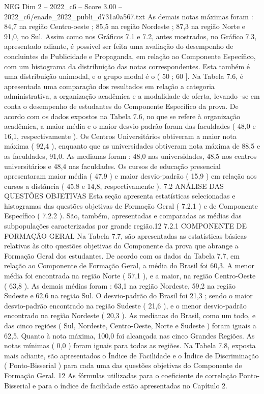 \begin{textsample}{NEG Dim 2 – 2022\_c6 – Score 3.00 – 2022\_c6/enade\_2022\_publi\_d731a0a567.txt}
As demais notas máximas foram : 84,7 na região Centro-oeste ; 85,5 na região Nordeste ; 87,3 na região Norte e 91,0, no Sul.
Assim como nos Gráficos 7.1 e 7.2, antes mostrados, no Gráfico 7.3, apresentado adiante, é possível ser feita uma avaliação do desempenho de concluintes de Publicidade e Propaganda, em relação ao Componente Específico, com um histograma da distribuição das notas correspondentes.
Esta também é uma distribuição unimodal, e o grupo modal é o ( 50 ; 60 ].
Na Tabela 7.6, é apresentada uma comparação dos resultados em relação a categoria administrativa, a organização acadêmica e a modalidade de oferta, levando -se em conta o desempenho de estudantes do Componente Específico da prova.
De acordo com os dados expostos na Tabela 7.6, no que se refere à organização acadêmica, a maior média e o maior desvio-padrão foram das faculdades ( 48,0 e 16,1, respectivamente ).
Os Centros Universitários obtiveram a maior nota máxima ( 92,4 ), enquanto que as universidades obtiveram nota máxima de 88,5 e as faculdades, 91,0.
As medianas foram : 48,0 nas universidades, 48,5 nos centros universitários e 48,4 nas faculdades.
Os cursos de educação presencial apresentaram maior média ( 47,9 ) e maior desvio-padrão ( 15,9 ) em relação aos cursos a distância ( 45,8 e 14,8, respectivamente ). 7.2 ANÁLISE DAS QUESTÕES OBJETIVAS Esta seção apresenta estatísticas selecionadas e histogramas das questões objetivas de Formação Geral ( 7.2.1 ) e de Componente Específico ( 7.2.2 ).
São, também, apresentadas e comparadas as médias das subpopulações caracterizadas por grande região.12 7.2.1 COMPONENTE DE FORMAÇÃO GERAL Na Tabela 7.7, são apresentadas as estatísticas básicas relativas às oito questões objetivas do Componente da prova que abrange a Formação Geral dos estudantes.
De acordo com os dados da Tabela 7.7, em relação ao Componente de Formação Geral, a média do Brasil foi 60,3.
A menor média foi encontrada na região Norte ( 57,1 ), e a maior, na região Centro-Oeste ( 63,8 ).
As demais médias foram : 63,1 na região Nordeste, 59,2 na região Sudeste e 62,6 na região Sul.
O desvio-padrão do Brasil foi 21,3 ; sendo o maior desvio-padrão encontrado na região Sudeste ( 21,6 ), e o menor desvio-padrão encontrado na região Nordeste ( 20,3 ).
As medianas do Brasil, como um todo, e das cinco regiões ( Sul, Nordeste, Centro-Oeste, Norte e Sudeste ) foram iguais a 62,5.
Quanto à nota máxima, 100,0 foi alcançada nas cinco Grandes Regiões.
As notas mínimas ( 0,0 ) foram iguais para todas as regiões.
Na Tabela 7.8, exposta mais adiante, são apresentados o Índice de Facilidade e o Índice de Discriminação ( Ponto-Bisserial ) para cada uma das questões objetivas do Componente de Formação Geral. 12 As fórmulas utilizadas para o coeficiente de correlação Ponto-Bisserial e para o índice de facilidade estão apresentadas no Capítulo 2.

\end{textsample}
